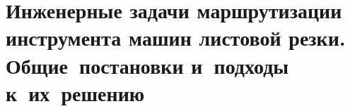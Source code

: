 

\part{
  Инженерные задачи
  маршрутизации инструмента машин листовой резки.
  Общие~постановки
  и~подходы к~их~решению
}



